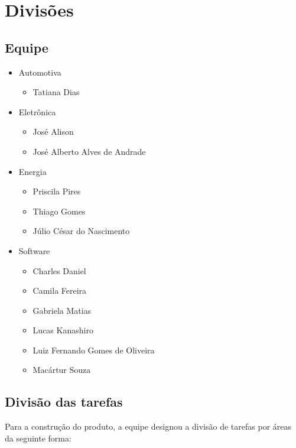 \chapter[Divisões]{Divisões}

\section{Equipe}
\begin{itemize}
	\item Automotiva
		\begin{itemize}
			\item Tatiana Dias
		\end{itemize}
	\item Eletrônica
		\begin{itemize}
			\item José Alison
			\item José Alberto Alves de Andrade
		\end{itemize}
	\item Energia
		\begin{itemize}
			\item Priscila Pires
			\item Thiago Gomes
			\item Júlio César do Nascimento
		\end{itemize}
	\item Software
		\begin{itemize}
			\item Charles Daniel
			\item Camila Fereira
			\item Gabriela Matias
			\item Lucas Kanashiro
			\item Luiz Fernando Gomes de Oliveira
			\item Macártur Souza
		\end{itemize}
\end{itemize}

\section{Divisão das tarefas}
Para a construção do produto, a equipe designou a divisão de tarefas por áreas da seguinte forma:

